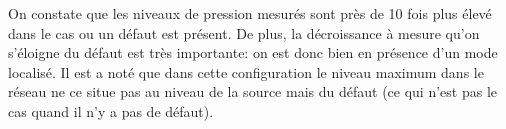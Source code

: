 On constate que les niveaux de pression mesurés sont près de 10 fois plus élevé dans le cas ou un défaut est présent. De plus, la décroissance à mesure qu'on s'éloigne du défaut est très importante: on est donc bien en présence d'un mode localisé. Il est a noté que dans cette configuration le niveau maximum dans le réseau ne ce situe pas au niveau de la source mais du défaut (ce qui n'est pas le cas quand il n'y a pas de défaut).
